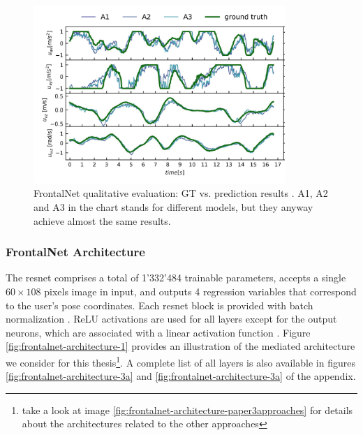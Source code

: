 \begin{figure}[!htb]
	\centering
	\includegraphics[width=0.85\textwidth]{"contents/images/03-frontalnet-gt-pred-2"}
	\caption[FrontalNet qualitative evaluation: GT vs. prediction results \cite{mantegazza2019visionbased}]{FrontalNet qualitative evaluation: GT vs. prediction results \cite{mantegazza2019visionbased}. A1, A2 and A3 in the chart stands for different models, but they anyway achieve almost the same results.}
	\label{fig:frontalnet-gt-pred}
\end{figure}



\subsubsection{FrontalNet Architecture}
\label{subsec:frontalnet-architecture}

The \gls{resnet} comprises a total of 1'332'484 trainable parameters, accepts a single $60 \times 108$ pixels image in input, and outputs 4 regression variables that correspond to the user's pose coordinates. Each \gls{resnet} block is provided with batch normalization \cite{bacthnorm}. ReLU activations \cite{act-relu} are used for all layers except for the output neurons, which are associated with a linear activation function \cite{act-linear}. Figure \ref{fig:frontalnet-architecture-1} provides an illustration of the mediated architecture we consider for this thesis\footnote{take a look at image \ref{fig:frontalnet-architecture-paper3approaches} for details about the architectures related to the other approaches}. A complete list of all layers is also available in figures \ref{fig:frontalnet-architecture-3a} and \ref{fig:frontalnet-architecture-3a} of the appendix. 

